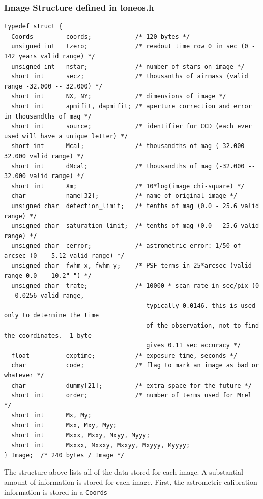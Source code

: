 \documentclass{article}
\begin{document}
\subsubsection*{Image Structure defined in loneos.h}
{\small
\begin{verbatim}
typedef struct {
  Coords         coords;            /* 120 bytes */
  unsigned int   tzero;             /* readout time row 0 in sec (0 - 142 years valid range) */
  unsigned int   nstar;             /* number of stars on image */
  short int      secz;              /* thousanths of airmass (valid range -32.000 -- 32.000) */
  short int      NX, NY;            /* dimensions of image */
  short int      apmifit, dapmifit; /* aperture correction and error in thousandths of mag */
  short int      source;            /* identifier for CCD (each ever used will have a unique letter) */
  short int      Mcal;              /* thousandths of mag (-32.000 -- 32.000 valid range) */
  short int      dMcal;             /* thousandths of mag (-32.000 -- 32.000 valid range) */
  short int      Xm;                /* 10*log(image chi-square) */
  char           name[32];          /* name of original image */
  unsigned char  detection_limit;   /* tenths of mag (0.0 - 25.6 valid range) */
  unsigned char  saturation_limit;  /* tenths of mag (0.0 - 25.6 valid range) */
  unsigned char  cerror;            /* astrometric error: 1/50 of arcsec (0 -- 5.12 valid range) */
  unsigned char  fwhm_x, fwhm_y;    /* PSF terms in 25*arcsec (valid range 0.0 -- 10.2" ") */
  unsigned char  trate;             /* 10000 * scan rate in sec/pix (0 -- 0.0256 valid range, 
                                       typically 0.0146. this is used only to determine the time
                                       of the observation, not to find the coordinates.  1 byte
                                       gives 0.11 sec accuracy */
  float          exptime;           /* exposure time, seconds */
  char           code;              /* flag to mark an image as bad or whatever */
  char           dummy[21];         /* extra space for the future */
  short int      order;             /* number of terms used for Mrel */
  short int      Mx, My;
  short int      Mxx, Mxy, Myy;
  short int      Mxxx, Mxxy, Mxyy, Myyy;
  short int      Mxxxx, Mxxxy, Mxxyy, Mxyyy, Myyyy;
} Image;  /* 240 bytes / Image */
\end{verbatim}}
The structure above lists all of the data stored for each image.  A
substantial amount of information is stored for each image.  First,
the astrometric calibration information is stored in a {\tt Coords}
\end{document}
